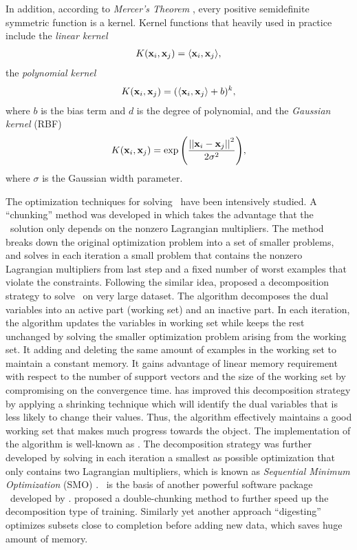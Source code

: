 {In addition, according to \textit{Mercer's Theorem} \citep{taylor04}, every positive semidefinite symmetric function is a kernel.
Kernel functions that heavily used in practice include the \textit{linear kernel}
\begin{align*}
	K(\mathbf {x}_i,\mathbf {x}_j) = \langle \mathbf {x}_i, \mathbf {x}_j \rangle,
\end{align*}
the \textit{polynomial kernel}
\begin{align*}
	K(\mathbf {x}_i,\mathbf {x}_j) = (\langle \mathbf {x}_i, \mathbf {x}_j \rangle + b)^k,
\end{align*}
where $b$ is the bias term and $d$ is the degree of polynomial, and the \textit{Gaussian kernel} (RBF)
\begin{align*}
	K(\mathbf {x}_i,\mathbf {x}_j) = \exp{\left(\frac{\left|\left| {\mathbf {x}_i}-{\mathbf {x}_j} \right|\right|^2}{2\sigma^2}\right)},
\end{align*}
where $\sigma$ is the Gaussian width parameter.

The optimization techniques for solving \svm\ have been intensively studied.
A ``chunking'' method was developed in \citep{Vapnik82estimation} which takes the advantage that the \svm\ solution only depends on the nonzero Lagrangian multipliers.
The method breaks down the original optimization problem into a set of smaller problems, and solves in each iteration a small problem that contains the nonzero Lagrangian multipliers from last step and a fixed number of worst examples that violate the constraints.
Following the similar idea, \citet{Osuna97an} proposed a decomposition strategy to solve \svm\ on very large dataset.
The algorithm decomposes the dual variables into an active part (working set) and an inactive part.
In each iteration, the algorithm updates the variables in working set while keeps the rest unchanged by solving the smaller optimization problem arising from the working set.
It adding and deleting the same amount of examples in the working set to maintain a constant memory.
It gains advantage of linear memory requirement with respect to the number of support vectors and the size of the working set by compromising on the convergence time.
\citep{Joachims98making} has improved this decomposition strategy by applying a shrinking technique which will identify the dual variables that is less likely to change their values.
Thus, the algorithm effectively maintains a good working set that makes much progress towards the object.
The implementation of the algorithm is well-known as \svmlight.
The decomposition strategy was further developed by solving in each iteration a smallest as possible optimization that only contains two Lagrangian multipliers, which is known as \textit{Sequential Minimum Optimization} (SMO) \citep{Platt98sequential,Platt99fast}.
\smo\ is the basis of another powerful software package \libsvm\ developed by \citet{Chang11libsvm}.
\citet{Perezcruz04double} proposed a double-chunking method to further speed up the decomposition type of training. 
Similarly yet another approach ``digesting'' \citep{Decoste02support} optimizes subsets close to completion before adding new data, which saves huge amount of memory.

}
